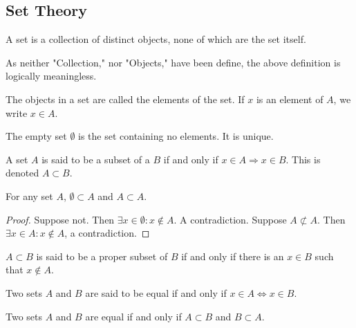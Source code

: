 \documentclass[crop=false,class=book,oneside]{standalone}
\begin{document}
        \subsection{Set Theory}
            \begin{definition}
                A set is a collection of distinct objects,
                none of which are the set itself.
            \end{definition}
            As neither "Collection," nor "Objects," have been
            define, the above definition is logically meaningless.
            \begin{definition}
                The objects in a set are called the elements of
                the set. If $x$ is an element of $A$,
                we write $x\in A$.
            \end{definition}
            \begin{definition}
                The empty set $\emptyset$ is the set containing
                no elements. It is unique.
            \end{definition}
            \begin{definition}
                A set $A$ is said to be a subset of a $B$ if
                and only if $x\in{A}\Rightarrow{x}\in{B}$.
                This is denoted $A\subset B$.
            \end{definition}
            \begin{corollary}
                For any set $A$, $\emptyset\subset{A}$
                and $A\subset{A}$.
            \end{corollary}
            \begin{proof}
                Suppose not. Then
                $\exists{x}\in\emptyset:x\notin A$.
                A contradiction. Suppose $A\not\subset A$.
                Then $\exists{x}\in{A}:x\notin{A}$,
                a contradiction.
            \end{proof}
            \begin{definition}
                $A\subset B$ is said to be a proper subset
                of $B$ if and only if there is an $x\in B$
                such that $x\notin A$.
            \end{definition}
            \begin{definition}
                Two sets $A$ and $B$ are said to be equal
                if and only if $x\in{A}\Leftrightarrow{x}\in B$.
            \end{definition}
            \begin{theorem}
                Two sets $A$ and $B$ are equal if and only
                if $A\subset{B}$ and $B\subset{A}$.
            \end{theorem}
\end{document}
